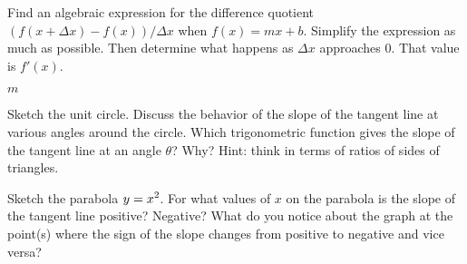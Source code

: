 \begin{exercises}
\exercise
Find an algebraic expression for the difference quotient $(f(x+\Delta
x)-f(x))/\Delta x$ when $f(x)=mx+b$.  Simplify the expression as
much as possible.  Then determine what happens as $\Delta x$ approaches 0.
That value is $f'(x)$.
\begin{answer} $m$
\end{answer}
\label{ex:derivative of a line}

\exercise Sketch the unit circle.  Discuss the behavior of the slope
of the tangent line at various angles around the circle.  Which
trigonometric function gives the slope of the tangent line at an angle
$\theta$?  Why? Hint: think in terms of ratios of sides of
  triangles.

 \exercise Sketch the parabola $\displaystyle y=x^2$.  For what values of $x$ on the parabola
 is the slope of the tangent line positive?  Negative?  What do you notice
 about the graph at the point(s) where the sign of the slope changes from
 positive to negative and vice versa?

\end{exercises}
